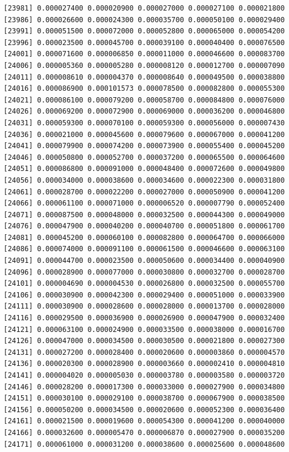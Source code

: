 \documentclass[]{article}
\begin{document}
\begin{verbatim}
[23981] 0.000027400 0.000020900 0.000027000 0.000027100 0.000021800
[23986] 0.000026600 0.000024300 0.000035700 0.000050100 0.000029400
[23991] 0.000051500 0.000072000 0.000052800 0.000065000 0.000054200
[23996] 0.000023500 0.000045700 0.000039100 0.000040400 0.000076500
[24001] 0.000071600 0.000006850 0.000011000 0.000046600 0.000083700
[24006] 0.000005360 0.000005280 0.000008120 0.000012700 0.000007090
[24011] 0.000008610 0.000004370 0.000008640 0.000049500 0.000038800
[24016] 0.000086900 0.000101573 0.000078500 0.000082800 0.000055300
[24021] 0.000086100 0.000079200 0.000058700 0.000084800 0.000076000
[24026] 0.000069200 0.000072900 0.000069000 0.000036200 0.000046800
[24031] 0.000059300 0.000070100 0.000059300 0.000056000 0.000007430
[24036] 0.000021000 0.000045600 0.000079600 0.000067000 0.000041200
[24041] 0.000079900 0.000074200 0.000073900 0.000055400 0.000045200
[24046] 0.000050800 0.000052700 0.000037200 0.000065500 0.000064600
[24051] 0.000086800 0.000091000 0.000048400 0.000072600 0.000049800
[24056] 0.000034000 0.000038600 0.000034600 0.000022300 0.000031800
[24061] 0.000028700 0.000022200 0.000027000 0.000050900 0.000041200
[24066] 0.000061100 0.000071000 0.000006520 0.000007790 0.000052400
[24071] 0.000087500 0.000048000 0.000032500 0.000044300 0.000049000
[24076] 0.000047900 0.000040200 0.000040700 0.000051800 0.000061700
[24081] 0.000045200 0.000060100 0.000082800 0.000064700 0.000066000
[24086] 0.000074000 0.000091100 0.000061500 0.000046600 0.000063100
[24091] 0.000044700 0.000023500 0.000050600 0.000034400 0.000040900
[24096] 0.000028900 0.000077000 0.000030800 0.000032700 0.000028700
[24101] 0.000004690 0.000004530 0.000026800 0.000032500 0.000055700
[24106] 0.000030900 0.000042300 0.000029400 0.000051000 0.000033900
[24111] 0.000030900 0.000028600 0.000028000 0.000013700 0.000028000
[24116] 0.000029500 0.000036900 0.000026900 0.000047900 0.000032400
[24121] 0.000063100 0.000024900 0.000033500 0.000038000 0.000016700
[24126] 0.000047000 0.000034500 0.000030500 0.000021800 0.000027300
[24131] 0.000027200 0.000028400 0.000020600 0.000003860 0.000004570
[24136] 0.000020300 0.000028900 0.000003660 0.000002410 0.000004810
[24141] 0.000004020 0.000005030 0.000003780 0.000003580 0.000003720
[24146] 0.000028200 0.000017300 0.000033000 0.000027900 0.000034800
[24151] 0.000030100 0.000029100 0.000038700 0.000067900 0.000038500
[24156] 0.000050200 0.000034500 0.000020600 0.000052300 0.000036400
[24161] 0.000021500 0.000019600 0.000054300 0.000041200 0.000040000
[24166] 0.000032600 0.000005470 0.000006870 0.000027900 0.000035200
[24171] 0.000061000 0.000031200 0.000038600 0.000025600 0.000048600

\end{verbatim}
\end{document}
